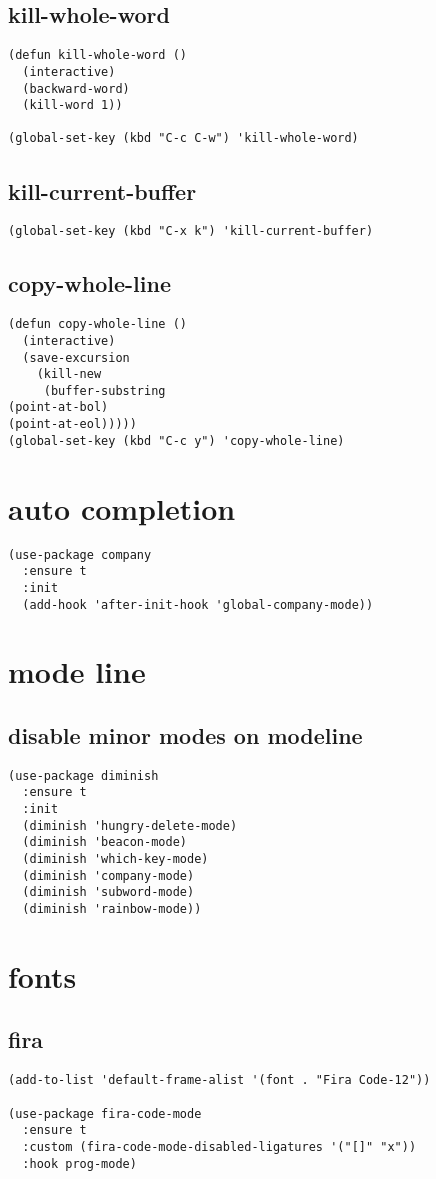\documentclass[11pt]{article}
\begin{document}
\subsection{kill-whole-word}
\label{sec:orgcdb0907}
\begin{verbatim}
(defun kill-whole-word ()
  (interactive)
  (backward-word)
  (kill-word 1))

(global-set-key (kbd "C-c C-w") 'kill-whole-word)
\end{verbatim}
\subsection{kill-current-buffer}
\label{sec:orge350928}
\begin{verbatim}
(global-set-key (kbd "C-x k") 'kill-current-buffer)
\end{verbatim}
\subsection{copy-whole-line}
\label{sec:org3cd1bd2}
\begin{verbatim}
(defun copy-whole-line ()
  (interactive)
  (save-excursion
    (kill-new
     (buffer-substring
(point-at-bol)
(point-at-eol)))))
(global-set-key (kbd "C-c y") 'copy-whole-line)
\end{verbatim}
\section{auto completion}
\label{sec:orgdae9871}
\begin{verbatim}
(use-package company
  :ensure t
  :init
  (add-hook 'after-init-hook 'global-company-mode))
\end{verbatim}
\section{mode line}
\label{sec:org220c584}
\subsection{disable minor modes on modeline}
\label{sec:orgceb1f3d}
\begin{verbatim}
(use-package diminish
  :ensure t
  :init
  (diminish 'hungry-delete-mode)
  (diminish 'beacon-mode)
  (diminish 'which-key-mode)
  (diminish 'company-mode)
  (diminish 'subword-mode)
  (diminish 'rainbow-mode))
\end{verbatim}
\section{fonts}
\label{sec:org80579b8}
\subsection{fira}
\label{sec:org2259ecb}
\begin{verbatim}
(add-to-list 'default-frame-alist '(font . "Fira Code-12"))

(use-package fira-code-mode
  :ensure t
  :custom (fira-code-mode-disabled-ligatures '("[]" "x"))
  :hook prog-mode)

\end{verbatim}
\end{document}

